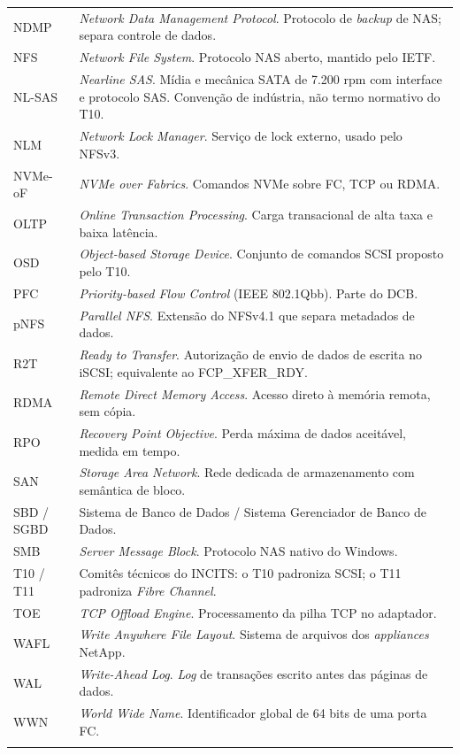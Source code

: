 \documentclass[11pt,a4paper]{article}
\begin{document}
{\begin{longtable}{@{}p{1.9cm}p{13.2cm}@{}}
NDMP & \textit{Network Data Management Protocol}. Protocolo de \textit{backup} de NAS; separa
controle de dados. \\
NFS & \textit{Network File System}. Protocolo NAS aberto, mantido pelo IETF. \\
NL-SAS & \textit{Nearline SAS}. Mídia e mecânica SATA de 7.200 rpm com interface e protocolo SAS.
Convenção de indústria, não termo normativo do T10. \\
NLM & \textit{Network Lock Manager}. Serviço de lock externo, usado pelo NFSv3. \\
NVMe-oF & \textit{NVMe over Fabrics}. Comandos NVMe sobre FC, TCP ou RDMA. \\
OLTP & \textit{Online Transaction Processing}. Carga transacional de alta taxa e baixa latência. \\
OSD & \textit{Object-based Storage Device}. Conjunto de comandos SCSI proposto pelo T10. \\
PFC & \textit{Priority-based Flow Control} (IEEE 802.1Qbb). Parte do DCB. \\
pNFS & \textit{Parallel NFS}. Extensão do NFSv4.1 que separa metadados de dados. \\
R2T & \textit{Ready to Transfer}. Autorização de envio de dados de escrita no iSCSI; equivalente ao
FCP\_XFER\_RDY. \\
RDMA & \textit{Remote Direct Memory Access}. Acesso direto à memória remota, sem cópia. \\
RPO & \textit{Recovery Point Objective}. Perda máxima de dados aceitável, medida em tempo. \\
SAN & \textit{Storage Area Network}. Rede dedicada de armazenamento com semântica de bloco. \\
SBD / SGBD & Sistema de Banco de Dados / Sistema Gerenciador de Banco de Dados. \\
SMB & \textit{Server Message Block}. Protocolo NAS nativo do Windows. \\
T10 / T11 & Comitês técnicos do INCITS: o T10 padroniza SCSI; o T11 padroniza \textit{Fibre Channel}. \\
TOE & \textit{TCP Offload Engine}. Processamento da pilha TCP no adaptador. \\
WAFL & \textit{Write Anywhere File Layout}. Sistema de arquivos dos \textit{appliances} NetApp. \\
WAL & \textit{Write-Ahead Log}. \textit{Log} de transações escrito antes das páginas de dados. \\
WWN & \textit{World Wide Name}. Identificador global de 64 bits de uma porta FC. \\ \\
\end{longtable}}
\end{document}
